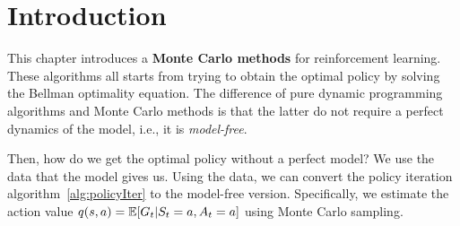 \section{Introduction}
This chapter introduces a \textbf{Monte Carlo methods} for reinforcement learning.
These algorithms all starts from trying to obtain the optimal policy by solving the Bellman optimality equation.
The difference of pure dynamic programming algorithms and Monte Carlo methods is that the latter
do not require a perfect dynamics of the model, i.e., it is \emph{model-free}.

Then, how do we get the optimal policy without a perfect model? We use the data that the model gives us.
Using the data, we can convert the policy iteration algorithm~\ref{alg:policyIter} to the model-free version.
Specifically, we estimate the action value $q(s,a)=\mathbb{E}[G_t|S_t=a,A_t=a]$ using Monte Carlo sampling.


